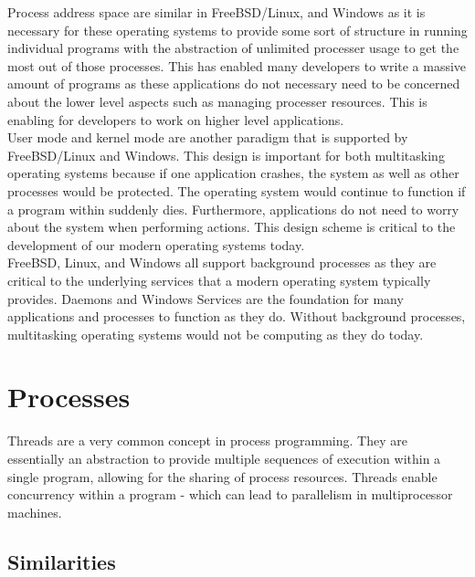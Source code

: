 \documentclass[letterpaper,10pt,titlepage]{article}
\begin{document}
Process address space are similar in FreeBSD/Linux, and Windows as it is necessary for these operating systems to provide some sort of structure in running individual programs with the abstraction of unlimited processer usage to get the most out of those processes.  This has enabled many developers to write a massive amount of programs as these applications do not necessary need to be concerned about the lower level aspects such as managing processer resources.  This is enabling for developers to work on higher level applications.\\

User mode and kernel mode are another paradigm that is supported by FreeBSD/Linux and Windows.  This design is important for both multitasking operating systems because if one application crashes, the system as well as other processes would be protected.  The operating system would continue to function if a program within suddenly dies.  Furthermore, applications do not need to worry about the system when performing actions.  This design scheme is critical to the development of our modern operating systems today.\\

FreeBSD, Linux, and Windows all support background processes as they are critical to the underlying services that a modern operating system typically provides.  Daemons and Windows Services are the foundation for many applications and processes to function as they do.  Without background processes, multitasking operating systems would not be computing as they do today.\\

\section{Processes}

Threads are a very common concept in process programming.  They are essentially an abstraction to provide multiple sequences of execution within a single program, allowing for the sharing of process resources.  Threads enable concurrency within a program - which can lead to parallelism in multiprocessor machines.

\subsection{Similarities}
\end{document}
